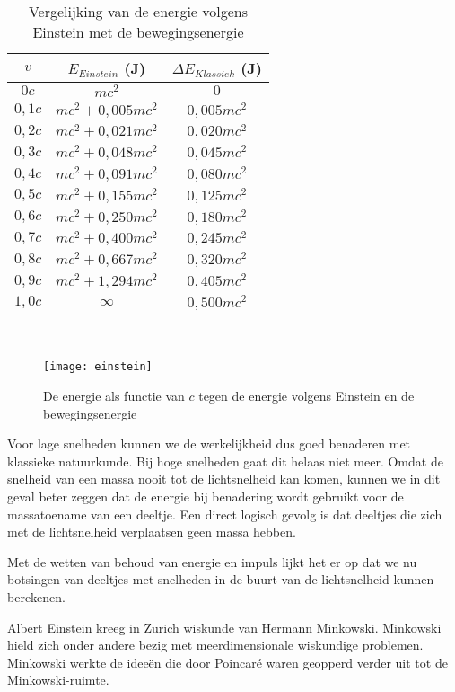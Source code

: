 \begin{table}[h]
\begin{centering}
\begin{tabular}{|c|c|c|}
\hline 
$v$  & $E_{Einstein}$ (J) & $\Delta E_{Klassiek}$ (J)\tabularnewline
\hline 
\hline 
$0c$ & $mc^{2}$ & $0$\tabularnewline
\hline 
$0,1c$ & $mc^{2}+0,005mc^{2}$ & $0,005mc^{2}$\tabularnewline
\hline 
$0,2c$ & $mc^{2}+0,021mc^{2}$ & $0,020mc^{2}$\tabularnewline
\hline 
$0,3c$ & $mc^{2}+0,048mc^{2}$ & $0,045mc^{2}$\tabularnewline
\hline 
$0,4c$ & $mc^{2}+0,091mc^{2}$ & $0,080mc^{2}$\tabularnewline
\hline 
$0,5c$ & $mc^{2}+0,155mc^{2}$ & $0,125mc^{2}$\tabularnewline
\hline 
$0,6c$ & $mc^{2}+0,250mc^{2}$ & $0,180mc^{2}$\tabularnewline
\hline 
$0,7c$ & $mc^{2}+0,400mc^{2}$ & $0,245mc^{2}$\tabularnewline
\hline 
$0,8c$ & $mc^{2}+0,667mc^{2}$ & $0,320mc^{2}$\tabularnewline
\hline 
$0,9c$ & $mc^{2}+1,294mc^{2}$ & $0,405mc^{2}$\tabularnewline
\hline 
$1,0c$ & $\infty$ & $0,500mc^{2}$\tabularnewline
\hline 
\end{tabular}\\
\medskip{}

\par\end{centering}

\caption{Vergelijking van de energie volgens Einstein met de bewegingsenergie}
\end{table}


\begin{figure}[h]
\centering
\texttt{[image: einstein]}

\caption{De energie als functie van $c$ tegen de energie volgens Einstein
en de bewegingsenergie}
\end{figure}


Voor lage snelheden kunnen we de werkelijkheid dus goed benaderen
met klassieke natuurkunde. Bij hoge snelheden gaat dit helaas niet
meer. Omdat de snelheid van een massa nooit tot de lichtsnelheid kan
komen, kunnen we in dit geval beter zeggen dat de energie bij benadering
wordt gebruikt voor de massatoename van een deeltje. Een direct logisch
gevolg is dat deeltjes die zich met de lichtsnelheid verplaatsen geen
massa hebben.

Met de wetten van behoud van energie en impuls lijkt het er op dat
we nu botsingen van deeltjes met snelheden in de buurt van de lichtsnelheid
kunnen berekenen.

Albert Einstein kreeg in Zurich wiskunde van Hermann Minkowski. Minkowski
hield zich onder andere bezig met meerdimensionale wiskundige problemen.
Minkowski werkte de ideeën die door Poincaré waren geopperd verder
uit tot de Minkowski-ruimte.

